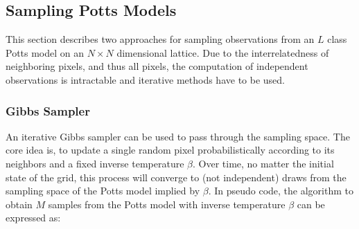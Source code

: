 \documentclass[12pt, twoside]{article}
\newcommand{\1}{\mathbb{1}}
\begin{document}
\subsection{Sampling Potts Models} \label{model_sampling} %
This section describes two approaches for sampling observations from an $L$ class Potts model on an $N \times N$ dimensional lattice. Due to the interrelatedness of neighboring pixels, and thus all pixels, the computation of independent observations is intractable and iterative methods have to be used.

\subsubsection{Gibbs Sampler}\label{gibbs_sampler}
An iterative Gibbs sampler \citep{geman1987stochastic} can be used to pass through the sampling space. The core idea is, to update a single random pixel probabilistically according to its neighbors and a fixed inverse temperature $\beta$. Over time, no matter the initial state of the grid, this process will converge to (not independent) draws from the sampling space of the Potts model implied by $\beta$. 
In pseudo code, the algorithm to obtain $M$ samples from the Potts model with inverse temperature $\beta$ can be expressed as: \\
\end{document}

